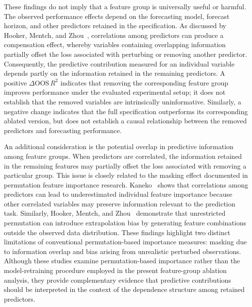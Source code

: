 \documentclass[runningheads,orivec]{llncs}
\begin{document}
These findings do not imply that a feature group is universally useful or harmful. The observed performance effects depend on the forecasting model, forecast horizon, and other predictors retained in the specification. As discussed by Hooker, Mentch, and Zhou~\cite{hooker2021}, correlations among predictors can produce a compensation effect, whereby variables containing overlapping information partially offset the loss associated with perturbing or removing another predictor. Consequently, the predictive contribution measured for an individual variable depends partly on the information retained in the remaining predictors. A positive $\Delta \mathrm{OOS}\,R^2$ indicates that removing the corresponding feature group improves performance under the evaluated experimental setup; it does not establish that the removed variables are intrinsically uninformative. Similarly, a negative change indicates that the full specification outperforms its corresponding ablated version, but does not establish a causal relationship between the removed predictors and forecasting performance.

An additional consideration is the potential overlap in predictive information among feature groups. When predictors are correlated, the information retained in the remaining features may partially offset the loss associated with removing a particular group. This issue is closely related to the masking effect documented in permutation feature importance research. Kaneko~\cite{kaneko2022} shows that correlations among predictors can lead to underestimated individual feature importance because other correlated variables may preserve information relevant to the prediction task. Similarly, Hooker, Mentch, and Zhou~\cite{hooker2021} demonstrate that unrestricted permutation can introduce extrapolation bias by generating feature combinations outside the observed data distribution. These findings highlight two distinct limitations of conventional permutation-based importance measures: masking due to information overlap and bias arising from unrealistic perturbed observations. Although these studies examine permutation-based importance rather than the model-retraining procedure employed in the present feature-group ablation analysis, they provide complementary evidence that predictive contributions should be interpreted in the context of the dependence structure among retained predictors.
\end{document}
